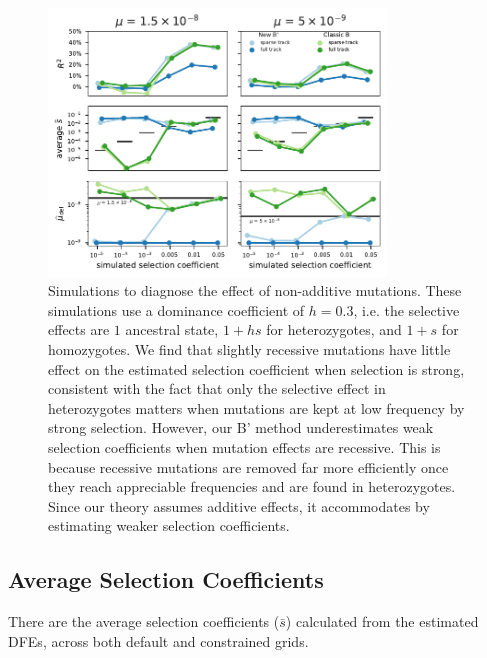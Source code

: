 \documentclass[11pt]{article}
\begin{document}
\begin{figure}[htbp]
  \label{suppfig:sim-rec}
  \centering
  \includegraphics[width=0.8\textwidth]{figures/supplementary/subfigure_sim_mle_recessive.pdf}

  \caption{Simulations to diagnose the effect of non-additive mutations. These
      simulations use a dominance coefficient of $h=0.3$, i.e. the selective
      effects are $1$ ancestral state, $1+hs$ for heterozygotes, and $1+s$ for
      homozygotes. We find that slightly recessive mutations have little effect
      on the estimated selection coefficient when selection is strong,
      consistent with the fact that only the selective effect in heterozygotes
      matters when mutations are kept at low frequency by strong selection.
      However, our B' method underestimates weak selection coefficients when
      mutation effects are recessive. This is because recessive mutations are
      removed far more efficiently once they reach appreciable frequencies and
      are found in heterozygotes. Since our theory assumes additive effects, it
      accommodates by estimating weaker selection coefficients.}

\end{figure}

\subsection{Average Selection Coefficients}

There are the average selection coefficients ($\bar{s}$) calculated from the
estimated DFEs, across both default and constrained grids.
\end{document}
